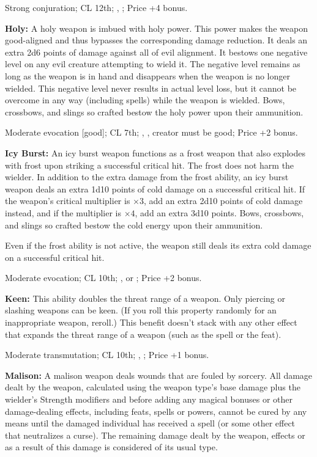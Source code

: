 Strong conjuration; CL 12th; , ; Price +4 bonus.

\textbf{Holy:} A holy weapon is imbued with holy power. This power makes the weapon good-aligned and thus bypasses the corresponding damage reduction. It deals an extra 2d6 points of damage against all of evil alignment. It bestows one negative level on any evil creature attempting to wield it. The negative level remains as long as the weapon is in hand and disappears when the weapon is no longer wielded. This negative level never results in actual level loss, but it cannot be overcome in any way (including  spells) while the weapon is wielded. Bows, crossbows, and slings so crafted bestow the holy power upon their ammunition.

Moderate evocation [good]; CL 7th; , , creator must be good; Price +2 bonus.

\textbf{Icy Burst:} An icy burst weapon functions as a frost weapon that also explodes with frost upon striking a successful critical hit. The frost does not harm the wielder. In addition to the extra damage from the frost ability, an icy burst weapon deals an extra 1d10 points of cold damage on a successful critical hit. If the weapon's critical multiplier is $\times3$, add an extra 2d10 points of cold damage instead, and if the multiplier is $\times4$, add an extra 3d10 points. Bows, crossbows, and slings so crafted bestow the cold energy upon their ammunition.

Even if the frost ability is not active, the weapon still deals its extra cold damage on a successful critical hit.

Moderate evocation; CL 10th; ,  or ; Price +2 bonus.

\textbf{Keen:} This ability doubles the threat range of a weapon. Only piercing or slashing weapons can be keen. (If you roll this property randomly for an inappropriate weapon, reroll.) This benefit doesn't stack with any other effect that expands the threat range of a weapon (such as the  spell or the  feat).

Moderate transmutation; CL 10th; , ; Price +1 bonus.

\textbf{Malison:} A malison weapon deals wounds that are fouled by sorcery. All damage dealt by the weapon, calculated using the weapon type's base damage plus the wielder's Strength modifiers and before adding any magical bonuses or other damage-dealing effects, including feats, spells or powers, cannot be cured by any means until the damaged individual has received a  spell (or some other effect that neutralizes a curse). The remaining damage dealt by the weapon, effects or as a result of this damage is considered of its usual type.

